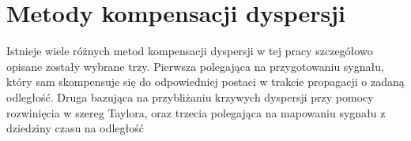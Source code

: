 
\chapter{Metody kompensacji dyspersji}
\label{cha:comp_disp}
 
Istnieje wiele różnych metod kompensacji dyspersji w tej pracy szczegółowo opisane zostały wybrane trzy. Pierwsza polegająca na przygotowaniu sygnału, który sam skompensuje się do odpowiedniej postaci w trakcie propagacji o zadaną odległość. Druga bazująca na przybliżaniu krzywych dyspersji przy pomocy rozwinięcia w szereg Taylora, oraz trzecia polegająca na mapowaniu sygnału z dziedziny czasu na odległość 
 






